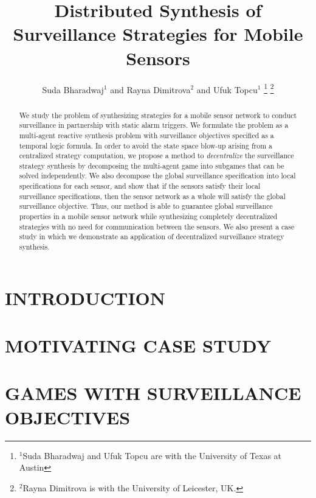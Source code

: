 \documentclass[letterpaper, 10 pt, conference]{ieeeconf}  %
\title{\LARGE \bf Distributed Synthesis of Surveillance Strategies for Mobile Sensors}
\author{Suda Bharadwaj$^{1}$ and Rayna Dimitrova$^{2}$ and Ufuk Topcu$^{1}$%
\thanks{$^{1}$Suda Bharadwaj and Ufuk Topcu are with the University of Texas at Austin}%
\thanks{$^{2}$Rayna Dimitrova is with the University of Leicester, UK.}%
}
\begin{document}
\maketitle
\thispagestyle{empty}
\pagestyle{empty}

\begin{abstract}
We study the problem of synthesizing strategies for a mobile sensor network to conduct surveillance in partnership with static alarm triggers. We formulate the problem as a multi-agent reactive synthesis problem with surveillance objectives specified as a temporal logic formula. In order to avoid the state space blow-up arising from a centralized strategy computation, we propose a method to \emph{decentralize} the surveillance strategy synthesis by decomposing the multi-agent game into subgames that can be solved independently. We also decompose the global surveillance specification into local specifications for each sensor, and show that if the sensors satisfy their local surveillance specifications, then the sensor network as a whole will satisfy the global surveillance objective. Thus, our method is able to guarantee global surveillance properties in a mobile sensor network while synthesizing completely decentralized strategies with no need for communication between the sensors. We also present a case study in which we demonstrate an application of decentralized surveillance strategy synthesis.
\end{abstract}


\section{INTRODUCTION}


\section{MOTIVATING CASE STUDY}\label{sec:casestudy}


\section{GAMES WITH SURVEILLANCE OBJECTIVES}

\end{document}
